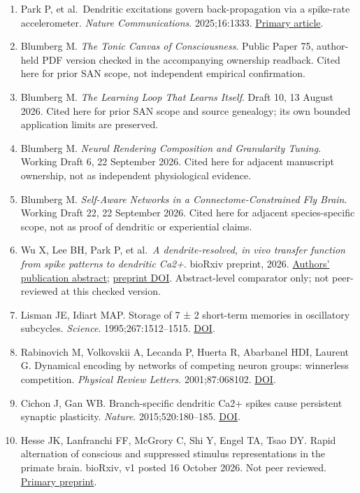 \documentclass[
  american,
  11pt,
  letterpaper,
]{article}
\begin{document}
\begin{enumerate}
\item
  Park P, et al.~Dendritic excitations govern back-propagation via a spike-rate accelerometer. \emph{Nature Communications}. 2025;16:1333. \href{https://doi.org/10.1038/s41467-025-55819-9}{Primary article}.
\item
  Blumberg M. \emph{The Tonic Canvas of Consciousness}. Public Paper 75, author-held PDF version checked in the accompanying ownership readback. Cited here for prior SAN scope, not independent empirical confirmation.
\item
  Blumberg M. \emph{The Learning Loop That Learns Itself}. Draft 10, 13 August 2026. Cited here for prior SAN scope and source genealogy; its own bounded application limits are preserved.
\item
  Blumberg M. \emph{Neural Rendering Composition and Granularity Tuning}. Working Draft 6, 22 September 2026. Cited here for adjacent manuscript ownership, not as independent physiological evidence.
\item
  Blumberg M. \emph{Self-Aware Networks in a Connectome-Constrained Fly Brain}. Working Draft 22, 22 September 2026. Cited here for adjacent species-specific scope, not as proof of dendritic or experiential claims.
\item
  Wu X, Lee BH, Park P, et al.~\emph{A dendrite-resolved, in vivo transfer function from spike patterns to dendritic Ca2+}. bioRxiv preprint, 2026. \href{https://www.janelia.org/publication/a-dendrite-resolved-in-vivo-transfer-function-from-spike-patterns-to-dendritic-ca2}{Authors' publication abstract}; \href{https://doi.org/10.64898/2026.01.18.700189}{preprint DOI}. Abstract-level comparator only; not peer-reviewed at this checked version.
\item
  Lisman JE, Idiart MAP. Storage of 7 ± 2 short-term memories in oscillatory subcycles. \emph{Science}. 1995;267:1512--1515. \href{https://doi.org/10.1126/science.7878473}{DOI}.
\item
  Rabinovich M, Volkovskii A, Lecanda P, Huerta R, Abarbanel HDI, Laurent G. Dynamical encoding by networks of competing neuron groups: winnerless competition. \emph{Physical Review Letters}. 2001;87:068102. \href{https://doi.org/10.1103/PhysRevLett.87.068102}{DOI}.
\item
  Cichon J, Gan WB. Branch-specific dendritic Ca2+ spikes cause persistent synaptic plasticity. \emph{Nature}. 2015;520:180--185. \href{https://doi.org/10.1038/nature14251}{DOI}.
\item
  Hesse JK, Lanfranchi FF, McGrory C, Shi Y, Engel TA, Tsao DY. Rapid alternation of conscious and suppressed stimulus representations in the primate brain. bioRxiv, v1 posted 16 October 2026. Not peer reviewed. \href{https://doi.org/10.64898/2026.10.15.759299}{Primary preprint}.

\end{enumerate}
\end{document}
